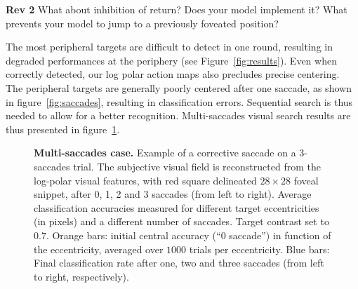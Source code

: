 {\color{red} \textbf{Rev 2} What about inhibition of return? Does your model implement it? What prevents your model to jump to a previously foveated position? }

The most peripheral targets are difficult to detect in one round, resulting in degraded performances at the periphery (see Figure~\ref{fig:results}). Even when correctly detected, our log polar action maps also precludes precise centering. The peripheral targets are generally poorly centered after one saccade, as shown in figure~\ref{fig:saccades}, resulting in classification errors. Sequential search is thus needed to allow for a better recognition. Multi-saccades visual search results are thus presented in figure~\ref{fig:results-saccades}.


\begin{figure}[t!]%
	\caption{
		{\bf Multi-saccades case.} %
		\A Example of a corrective saccade on a 3-saccades trial. The subjective visual field  is reconstructed from the log-polar visual features, with red square delineated $28\times28$ foveal snippet, after 0, 1, 2 and 3 saccades (from left to right).
		\B Average classification accuracies measured for different target eccentricities (in pixels) and a different number of saccades. Target contrast set to $0.7$. Orange bars: initial central accuracy (``0 saccade'') in function of the eccentricity, averaged over $1000$ trials per eccentricity. Blue bars: Final classification rate after one, two and three saccades (from left to right, respectively).
		\label{fig:results-saccades}}%
\end{figure}%


